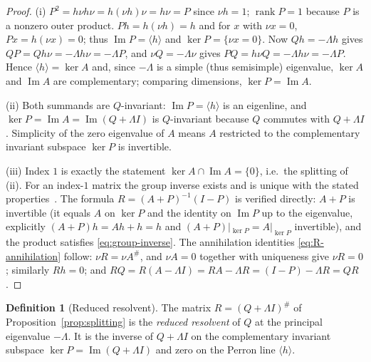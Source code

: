 \documentclass[11pt,reqno]{amsart}
\theoremstyle{plain}
\theoremstyle{definition}
\newtheorem{definition}[theorem]{Definition}
\theoremstyle{remark}
\DeclareMathOperator{\rank}{rank}
\DeclareMathOperator{\Imm}{Im}
\begin{document}
\begin{proof}
(i) $P^2=h\nu h\nu=h(\nu h)\nu=h\nu=P$ since $\nu h=1$; $\rank P=1$ because $P$ is a
nonzero outer product. $Ph=h(\nu h)=h$ and for $x$ with $\nu x=0$, $Px=h(\nu x)=0$;
thus $\Imm P=\langle h\rangle$ and $\ker P=\{\nu x=0\}$. Now $Qh=-\Lambda h$ gives
$QP=Qh\nu=-\Lambda h\nu=-\Lambda P$, and $\nu Q=-\Lambda\nu$ gives
$PQ=h\nu Q=-\Lambda h\nu=-\Lambda P$. Hence $\langle h\rangle=\ker A$ and, since
$-\Lambda$ is a simple (thus semisimple) eigenvalue, $\ker A$ and $\Imm A$ are
complementary; comparing dimensions, $\ker P=\Imm A$.

(ii) Both summands are $Q$-invariant: $\Imm P=\langle h\rangle$ is an eigenline, and
$\ker P=\Imm A=\Imm(Q+\Lambda I)$ is $Q$-invariant because $Q$ commutes with
$Q+\Lambda I$. Simplicity of the zero eigenvalue of $A$ means $A$ restricted to the
complementary invariant subspace $\ker P$ is invertible.

(iii) Index $1$ is exactly the statement $\ker A\cap\Imm A=\{0\}$, i.e.\ the
splitting of (ii). For an index-$1$ matrix the group inverse exists and is unique
with the stated properties~\cite[Ch.~4]{CampbellMeyer2009}. The formula
$R=(A+P)^{-1}(I-P)$ is verified directly: $A+P$ is invertible (it equals $A$ on
$\ker P$ and the identity on $\Imm P$ up to the eigenvalue, explicitly
$(A+P)h=Ah+h=h$ and $(A+P)|_{\ker P}=A|_{\ker P}$ invertible), and the product
satisfies \eqref{eq:group-inverse}. The annihilation identities
\eqref{eq:R-annihilation} follow: $\nu R=\nu A^{\#}$, and $\nu A=0$ together with
uniqueness give $\nu R=0$; similarly $Rh=0$; and $RQ=R(A-\Lambda I)=RA-\Lambda
R=(I-P)-\Lambda R=QR$.
\end{proof}

\begin{definition}[Reduced resolvent]\label{def:reduced-resolvent}
The matrix $R=(Q+\Lambda I)^{\#}$ of Proposition~\ref{prop:splitting} is the
\emph{reduced resolvent} of $Q$ at the principal eigenvalue $-\Lambda$. It is the
inverse of $Q+\Lambda I$ on the complementary invariant subspace $\ker P=\Imm
(Q+\Lambda I)$ and zero on the Perron line $\langle h\rangle$.
\end{definition}
\end{document}
